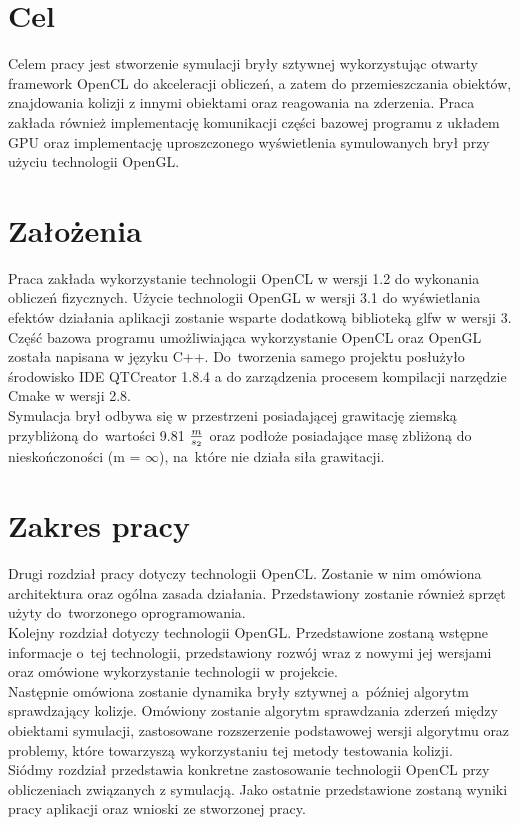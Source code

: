 \section{Cel}
Celem pracy jest stworzenie symulacji bryły sztywnej wykorzystując otwarty framework OpenCL do akceleracji obliczeń, a zatem do przemieszczania obiektów, znajdowania kolizji z innymi obiektami oraz reagowania na zderzenia. Praca zakłada również implementację komunikacji części bazowej programu z układem GPU oraz implementację uproszczonego wyświetlenia symulowanych brył przy użyciu technologii OpenGL.

\section{Założenia}
Praca zakłada wykorzystanie technologii OpenCL w wersji 1.2 do wykonania obliczeń fizycznych. Użycie technologii OpenGL w wersji 3.1 do wyświetlania efektów działania aplikacji zostanie wsparte dodatkową biblioteką glfw w wersji 3\cite{GLFW}. Część bazowa programu umożliwiająca wykorzystanie OpenCL oraz OpenGL została napisana w języku C++. Do~tworzenia samego projektu posłużyło środowisko IDE QTCreator 1.8.4 a do zarządzenia procesem kompilacji narzędzie Cmake w wersji 2.8. \\
Symulacja brył odbywa się w przestrzeni posiadającej grawitację ziemską przybliżoną do~wartości 9.81 $m \over s_2$ oraz podłoże posiadające masę zbliżoną do nieskończoności (m = $\infty$), na~które nie działa siła grawitacji.

\section{Zakres pracy}
Drugi rozdział pracy dotyczy technologii OpenCL. Zostanie w nim omówiona architektura oraz ogólna zasada działania. Przedstawiony zostanie również sprzęt użyty do~tworzonego oprogramowania.\\
Kolejny rozdział dotyczy technologii OpenGL. Przedstawione zostaną wstępne informacje o~tej technologii, przedstawiony rozwój wraz z nowymi jej wersjami oraz omówione wykorzystanie technologii w projekcie.\\
Następnie omówiona zostanie dynamika bryły sztywnej a~później algorytm sprawdzający kolizje. Omówiony zostanie algorytm sprawdzania zderzeń między obiektami symulacji, zastosowane rozszerzenie podstawowej wersji algorytmu oraz problemy, które towarzyszą wykorzystaniu tej metody testowania kolizji.\\
Siódmy rozdział przedstawia konkretne zastosowanie technologii OpenCL przy obliczeniach związanych z symulacją.
Jako ostatnie przedstawione zostaną wyniki pracy aplikacji oraz wnioski ze stworzonej pracy.